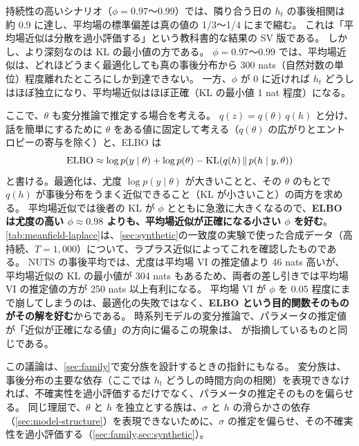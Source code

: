 持続性の高いシナリオ（$\phi = 0.97$〜$0.99$）では、隣り合う日の $h_t$ の事後相関は約 0.9 に達し、平均場の標準偏差は真の値の 1/3〜1/4 にまで縮む。
これは「平均場近似は分散を過小評価する」という教科書的な結果の SV 版である。
しかし、より深刻なのは KL の最小値の方である。
$\phi = 0.97$〜$0.99$ では、平均場近似は、どれほどうまく最適化しても真の事後分布から 300 nats（自然対数の単位）程度離れたところにしか到達できない。
一方、$\phi$ が 0 に近ければ $h_t$ どうしはほぼ独立になり、平均場近似はほぼ正確（KL の最小値 1 nat 程度）になる。

ここで、$\theta$ も変分推論で推定する場合を考える。
$q(z) = q(\theta)\, q(h)$ と分け、話を簡単にするために $\theta$ をある値に固定して考える（$q(\theta)$ の広がりとエントロピーの寄与を除く）と、ELBO は
\[
  \mathrm{ELBO} \approx \log p(y \mid \theta) + \log p(\theta) - \mathrm{KL}\!\left(q(h) \,\|\, p(h \mid y, \theta)\right)
\]
と書ける。最適化は、尤度 $\log p(y \mid \theta)$ が大きいことと、その $\theta$ のもとで $q(h)$ が事後分布をうまく近似できること（KL が小さいこと）の両方を求める。
平均場近似では後者の KL が $\phi$ とともに急激に大きくなるので、\textbf{ELBO は尤度の高い $\phi \approx 0.98$ よりも、平均場近似が正確になる小さい $\phi$ を好む}。
\cref{tab:meanfield-laplace}は、\cref{sec:synthetic}の一致度の実験で使った合成データ（高持続、$T = 1{,}000$）について、ラプラス近似によってこれを確認したものである。
NUTS の事後平均では、尤度は平均場 VI の推定値より 46 nats 高いが、平均場近似の KL の最小値が 304 nats もあるため、両者の差し引きでは平均場 VI の推定値の方が 250 nats 以上有利になる。
平均場 VI が $\phi$ を 0.05 程度にまで崩してしまうのは、最適化の失敗ではなく、\textbf{ELBO という目的関数そのものがその解を好む}からである。
時系列モデルの変分推論で、パラメータの推定値が「近似が正確になる値」の方向に偏るこの現象は、\textcite{turner2011} が指摘しているものと同じである。

\begin{table}[tbp]
  \centering
  \caption{平均場 VI が小さい $\phi$ を好む理由（\cref{sec:synthetic}の一致度の実験の合成データ、高持続、$T = 1{,}000$）。
    $\log p(y \mid \theta)$ と KL の最小値は、$\theta$ を固定した $p(h \mid y, \theta)$ のラプラス近似（正規近似）で計算した。
    「差」は $\log p(y \mid \theta)$ から KL の最小値を引いたもので、平均場 VI の ELBO（$\theta$ の事前分布と不確実性の寄与を除く）の近似である。大きいほど平均場 VI に選ばれやすい。}
  \label{tab:meanfield-laplace}
  \small
  
\end{table}

この議論は、\cref{sec:family}で変分族を設計するときの指針にもなる。
変分族は、事後分布の主要な依存（ここでは $h_t$ どうしの時間方向の相関）を表現できなければ、不確実性を過小評価するだけでなく、パラメータの推定そのものを偏らせる。
同じ理屈で、$\theta$ と $h$ を独立とする族は、$\sigma$ と $h$ の滑らかさの依存（\cref{sec:model-structure}）を表現できないために、$\sigma$ の推定を偏らせ、その不確実性を過小評価する（\cref{sec:family,sec:synthetic}）。

